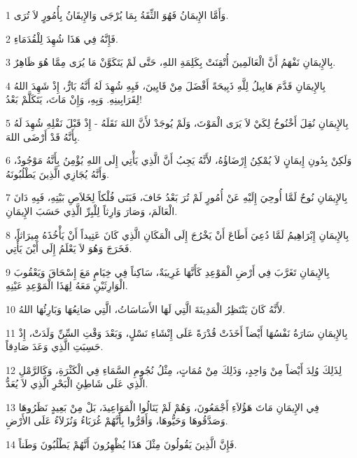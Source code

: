 \par 1 وَأَمَّا الإِيمَانُ فَهُوَ الثِّقَةُ بِمَا يُرْجَى وَالإِيقَانُ بِأُمُورٍ لاَ تُرَى.
\par 2 فَإِنَّهُ فِي هَذَا شُهِدَ لِلْقُدَمَاءِ.
\par 3 بِالإِيمَانِ نَفْهَمُ أَنَّ الْعَالَمِينَ أُتْقِنَتْ بِكَلِمَةِ اللهِ، حَتَّى لَمْ يَتَكَوَّنْ مَا يُرَى مِمَّا هُوَ ظَاهِرٌ.
\par 4 بِالإِيمَانِ قَدَّمَ هَابِيلُ لِلَّهِ ذَبِيحَةً أَفْضَلَ مِنْ قَايِينَ، فَبِهِ شُهِدَ لَهُ أَنَّهُ بَارٌّ، إِذْ شَهِدَ اللهُ لِقَرَابِينِهِ. وَبِهِ، وَإِنْ مَاتَ، يَتَكَلَّمْ بَعْدُ!
\par 5 بِالإِيمَانِ نُقِلَ أَخْنُوخُ لِكَيْ لاَ يَرَى الْمَوْتَ، وَلَمْ يُوجَدْ لأَنَّ اللهَ نَقَلَهُ - إِذْ قَبْلَ نَقْلِهِ شُهِدَ لَهُ بِأَنَّهُ قَدْ أَرْضَى اللهَ.
\par 6 وَلَكِنْ بِدُونِ إِيمَانٍ لاَ يُمْكِنُ إِرْضَاؤُهُ، لأَنَّهُ يَجِبُ أَنَّ الَّذِي يَأْتِي إِلَى اللهِ يُؤْمِنُ بِأَنَّهُ مَوْجُودٌ، وَأَنَّهُ يُجَازِي الَّذِينَ يَطْلُبُونَهُ.
\par 7 بِالإِيمَانِ نُوحٌ لَمَّا أُوحِيَ إِلَيْهِ عَنْ أُمُورٍ لَمْ تُرَ بَعْدُ خَافَ، فَبَنَى فُلْكاً لِخَلاَصِ بَيْتِهِ، فَبِهِ دَانَ الْعَالَمَ، وَصَارَ وَارِثاً لِلْبِرِّ الَّذِي حَسَبَ الإِيمَانِ.
\par 8 بِالإِيمَانِ إِبْرَاهِيمُ لَمَّا دُعِيَ أَطَاعَ أَنْ يَخْرُجَ إِلَى الْمَكَانِ الَّذِي كَانَ عَتِيداً أَنْ يَأْخُذَهُ مِيرَاثاً، فَخَرَجَ وَهُوَ لاَ يَعْلَمُ إِلَى أَيْنَ يَأْتِي.
\par 9 بِالإِيمَانِ تَغَرَّبَ فِي أَرْضِ الْمَوْعِدِ كَأَنَّهَا غَرِيبَةٌ، سَاكِناً فِي خِيَامٍ مَعَ إِسْحَاقَ وَيَعْقُوبَ الْوَارِثَيْنِ مَعَهُ لِهَذَا الْمَوْعِدِ عَيْنِهِ.
\par 10 لأَنَّهُ كَانَ يَنْتَظِرُ الْمَدِينَةَ الَّتِي لَهَا الأَسَاسَاتُ، الَّتِي صَانِعُهَا وَبَارِئُهَا اللهُ.
\par 11 بِالإِيمَانِ سَارَةُ نَفْسُهَا أَيْضاً أَخَذَتْ قُدْرَةً عَلَى إِنْشَاءِ نَسْلٍ، وَبَعْدَ وَقْتِ السِّنِّ وَلَدَتْ، إِذْ حَسِبَتِ الَّذِي وَعَدَ صَادِقاً.
\par 12 لِذَلِكَ وُلِدَ أَيْضاً مِنْ وَاحِدٍ، وَذَلِكَ مِنْ مُمَاتٍ، مِثْلُ نُجُومِ السَّمَاءِ فِي الْكَثْرَةِ، وَكَالرَّمْلِ الَّذِي عَلَى شَاطِئِ الْبَحْرِ الَّذِي لاَ يُعَدُّ.
\par 13 فِي الإِيمَانِ مَاتَ هَؤُلاَءِ أَجْمَعُونَ، وَهُمْ لَمْ يَنَالُوا الْمَوَاعِيدَ، بَلْ مِنْ بَعِيدٍ نَظَرُوهَا وَصَدَّقُوهَا وَحَيُّوهَا، وَأَقَرُّوا بِأَنَّهُمْ غُرَبَاءُ وَنُزَلاَءُ عَلَى الأَرْضِ.
\par 14 فَإِنَّ الَّذِينَ يَقُولُونَ مِثْلَ هَذَا يُظْهِرُونَ أَنَّهُمْ يَطْلُبُونَ وَطَناً.
